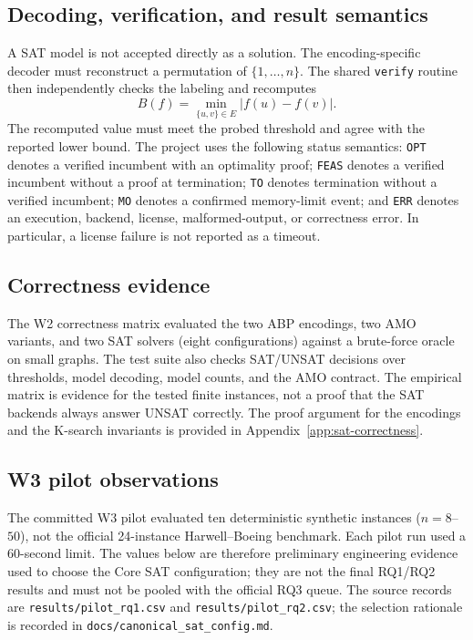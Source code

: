\subsection{Decoding, verification, and result semantics}
A SAT model is not accepted directly as a solution. The encoding-specific
decoder must reconstruct a permutation of $\{1,\ldots,n\}$. The shared
\texttt{verify} routine then independently checks the labeling and recomputes
\[
  B(f)=\min_{\{u,v\}\in E}|f(u)-f(v)|.
\]
The recomputed value must meet the probed threshold and agree with the
reported lower bound. The project uses the following status semantics:
\texttt{OPT} denotes a verified incumbent with an optimality proof;
\texttt{FEAS} denotes a verified incumbent without a proof at termination;
\texttt{TO} denotes termination without a verified incumbent; \texttt{MO}
denotes a confirmed memory-limit event; and \texttt{ERR} denotes an execution,
backend, license, malformed-output, or correctness error. In particular, a
license failure is not reported as a timeout.

\subsection{Correctness evidence}
The W2 correctness matrix evaluated the two ABP encodings, two AMO variants,
and two SAT solvers (eight configurations) against a brute-force oracle on
small graphs. The test suite also checks SAT/UNSAT decisions over thresholds,
model decoding, model counts, and the AMO contract. The empirical matrix is
evidence for the tested finite instances, not a proof that the SAT backends
always answer UNSAT correctly. The proof argument for the encodings and the
K-search invariants is provided in Appendix~\ref{app:sat-correctness}.


\subsection{W3 pilot observations}
\label{subsec:sat-pilot-observations}

The committed W3 pilot evaluated ten deterministic synthetic instances
($n=8$--$50$), not the official 24-instance Harwell--Boeing benchmark. Each
pilot run used a 60-second limit. The values below are therefore preliminary
engineering evidence used to choose the Core SAT configuration; they are not
the final RQ1/RQ2 results and must not be pooled with the official RQ3 queue.
The source records are \texttt{results/pilot\_rq1.csv} and
\texttt{results/pilot\_rq2.csv}; the selection rationale is recorded in
\texttt{docs/canonical\_sat\_config.md}.

